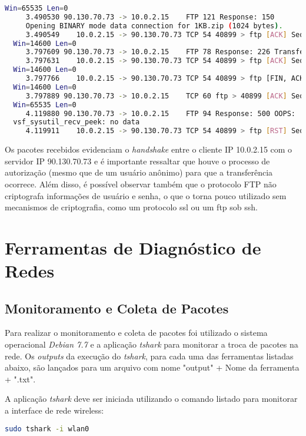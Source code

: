 \documentclass[a4paper]{report} %
\begin{document}
\begin{lstlisting}[language=bash]
  Win=65535 Len=0
     3.490530 90.130.70.73 -> 10.0.2.15    FTP 121 Response: 150
     Opening BINARY mode data connection for 1KB.zip (1024 bytes).
     3.490549    10.0.2.15 -> 90.130.70.73 TCP 54 40899 > ftp [ACK] Seq=83 Ack=264
  Win=14600 Len=0
     3.797609 90.130.70.73 -> 10.0.2.15    FTP 78 Response: 226 Transfer complete.
     3.797631    10.0.2.15 -> 90.130.70.73 TCP 54 40899 > ftp [ACK] Seq=83 Ack=288
  Win=14600 Len=0
     3.797766    10.0.2.15 -> 90.130.70.73 TCP 54 40899 > ftp [FIN, ACK] Seq=83 Ack=288
  Win=14600 Len=0
     3.797889 90.130.70.73 -> 10.0.2.15    TCP 60 ftp > 40899 [ACK] Seq=288 Ack=84
  Win=65535 Len=0
     4.119880 90.130.70.73 -> 10.0.2.15    FTP 94 Response: 500 OOPS:
  vsf_sysutil_recv_peek: no data
     4.119911    10.0.2.15 -> 90.130.70.73 TCP 54 40899 > ftp [RST] Seq=84 Win=0 Len=0

\end{lstlisting}

	Os pacotes recebidos evidenciam o \textit{handshake} entre o cliente IP 10.0.2.15 com o servidor IP 90.130.70.73 e é importante ressaltar que houve o processo de autorização (mesmo que de um usuário anônimo) para que a transferência ocorrece. Além disso, é possível observar também que o protocolo FTP não criptografa informações de usuário e senha, o que o torna pouco utilizado sem mecanismos de criptografia, como um protocolo ssl ou um ftp sob ssh.

\chapter{Ferramentas de Diagnóstico de Redes}
\label{chap_segundo}

\section{Monitoramento e Coleta de Pacotes}
\label{sec_segundo_monitoramento}

Para realizar o monitoramento e coleta de pacotes foi utilizado o sistema operacional \textit{Debian 7.7} e a aplicação \textit{tshark} para monitorar a troca de pacotes na rede.
Os \textit{outputs} da execução do \textit{tshark}, para cada uma das ferramentas listadas abaixo, são lançados para um arquivo com nome "output" + Nome da ferramenta + ".txt".

	A aplicação \textit{tshark} deve ser iniciada utilizando o comando listado para monitorar a interface de rede wireless:
\begin{lstlisting}[language=bash]
	sudo tshark -i wlan0
\end{lstlisting}
\end{document}
